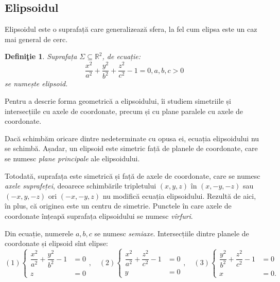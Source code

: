 \documentclass[11pt,a4paper]{article}
\newcommand\seq{\subseteq}
\theoremstyle{dotless}
\theoremstyle{dotlessdr}
\newtheorem{definition}{Defini\c{t}ie}[section]
\begin{document}

\subsection{Elipsoidul}

\indent\indent Elipsoidul este o suprafață care generalizează sfera, la fel cum
elipsa este un caz mai general de cerc.

\begin{definition}

	Suprafața $\Sigma \seq \mathbb{R}^2$, de ecuație: 
 \[
	\dfrac{x^2}{a^2} + \dfrac{y^2}{b^2} + \dfrac{z^2}{c^2} - 1 = 0, a, b, c > 0
\]
se numește \emph{elipsoid.}
\end{definition}

Pentru a descrie forma geometrică a elipsoidului, îi studiem simetriile și
intersecțiile cu axele de coordonate, precum și cu plane paralele cu axele de
coordonate.

Dacă schimbăm oricare dintre nedeterminate cu opusa ei, ecuația elipsoidului
nu se schimbă. Așadar, un elipsoid este simetric față de planele de coordonate,
care se numesc \emph{plane principale} ale elipsoidului.


Totodată, suprafața este simetrică și față de axele de coordonate, care se 
numesc \emph{axele suprafeței}, deoarece schimbările tripletului $(x, y, z)$
în $(x, -y, -z)$ sau $(-x, y, -z)$ ori $(-x, -y, z)$ nu modifică ecuația 
elipsoidului. Rezultă de aici, în plus, că originea este un centru de simetrie.
Punctele în care axele de coordonate înțeapă suprafața elipsoidului se numesc
\emph{vîrfuri}.

Din ecuație, numerele $a, b, c$ se numesc \emph{semiaxe}. Intersecțiile
dintre planele de coordonate și elipsoid sînt elipse: 
 \[
	(1) \begin{cases}	
	         \dfrac{x^2}{a^2} + \dfrac{y^2}{b^2} - 1 &= 0 \\
	         z &= 0
        \end{cases}, \quad 
    (2) \begin{cases}	
           \dfrac{x^2}{a^2} + \dfrac{z^2}{c^2} - 1 &= 0 \\
           y &= 0
       \end{cases}, \quad 
    (3) \begin{cases}	
           \dfrac{y^2}{b^2} + \dfrac{z^2}{c^2} - 1 &= 0 \\
           x &= 0.
        \end{cases}
\]
\end{document}
